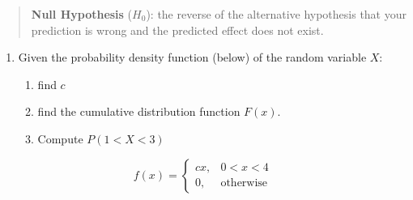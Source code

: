 \documentclass[]{article}
\providecommand{\tightlist}{%
  \setlength{\itemsep}{0pt}\setlength{\parskip}{0pt}}
\begin{document}
\begin{quote}
\textbf{Null Hypothesis} (\(H_0\)): the reverse of the alternative
hypothesis that your prediction is wrong and the predicted effect does
not exist.
\end{quote}

\newpage

\begin{enumerate}
\def\labelenumi{\arabic{enumi}.}
\item
  Given the probability density function (below) of the random variable
  \(X\):

  \begin{enumerate}
  \def\labelenumii{\alph{enumii}.}
  \tightlist
  \item
    find \(c\)
  \item
    find the cumulative distribution function \(F(x)\).
  \item
    Compute \(P(1 < X < 3)\)
  \end{enumerate}
\end{enumerate}

\[f(x) = \begin{cases} 
  cx, & 0 < x < 4 \\
  0, & \textrm{otherwise}
  \end{cases}\]
\end{document}
